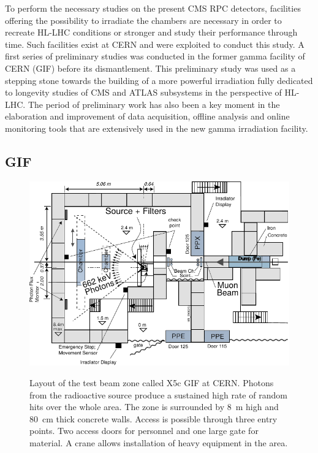 	To perform the necessary studies on the present CMS RPC detectors, facilities offering the possibility to irradiate the chambers are necessary in order to recreate HL-LHC conditions or stronger and study their performance through time. Such facilities exist at CERN and were exploited to conduct this study. A first series of preliminary studies was conducted in the former gamma facility of CERN (GIF) before its dismantlement. This preliminary study was used as a stepping stone towards the building of a more powerful irradiation fully dedicated to longevity studies of CMS and ATLAS subsystems in the perspective of HL-LHC. The period of preliminary work has also been a key moment in the elaboration and improvement of data acquisition, offline analysis and online monitoring tools that are extensively used in the new gamma irradiation facility.
	
		\subsection{GIF}
		\label{chapt5:ssec:GIF}
	
	\begin{figure}[H]
		\centering
		\includegraphics[width = \plotwidth]{fig/chapt5/GIF-Layout.pdf}\\
		\caption{\label{fig:GIFLayout} Layout of the test beam zone called X5c GIF at CERN. Photons from the radioactive source produce a sustained high rate of random hits over the whole area. The zone is surrounded by \SI{8}{m} high and \SI{80}{cm} thick concrete walls. Access is possible through three entry points. Two access doors for personnel and one large gate for material. A crane allows installation of heavy equipment in the area.}
	\end{figure}
		
